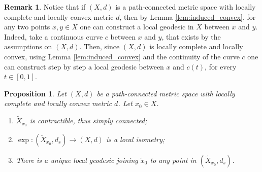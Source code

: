 \documentclass[11pt, a4paper, oneside]{memoir}
\theoremstyle{plain}\newtheorem{theorem}[subsection]{Theorem}
\newtheorem{proposition}[subsection]{Proposition}
\theoremstyle{definition}
\newtheorem{remark}[subsection]{Remark}
\newcommand{\parenum}{\setenumerate[1]{label=\textbf{(\arabic*)}}}
\newcommand{\twiddle}[1]{\widetilde{#1}}
\begin{document}
\begin{remark}
 Notice that if \((X,d)\) is a path-connected metric space with locally complete and locally convex metric \(d\), then by Lemma \ref{lem:induced_convex}, for any two points $x,y \in X$ one can construct a local geodesic in $X$ between $x$ and $y$. Indeed, take a continuous curve $c$ between $x$ and $y$, that exists by the assumptions on $(X,d)$. Then, since $(X,d)$ is locally complete and locally convex, using Lemma \ref{lem:induced_convex} and the continuity of the curve $c$ one can construct step by step a local geodesic between $x$ and $c(t)$, for every $t \in [0,1]$.
\end{remark}

\begin{proposition}\label{prop:twiddle simply connected}
Let \((X,d)\) be a path-connected metric space with locally complete and locally convex metric \(d\). Let $x_0 \in X$.
\parenum
\begin{enumerate}
    \item \(\twiddle{X}_{x_0}\) is contractible, thus simply connected;
    \item \(\exp:\left(\twiddle{X}_{x_0},d_s\right)\to (X,d)\) is a local isometry;
    \item There is a unique local geodesic joining \(\twiddle{x}_0\) to any  point in \(\left(\twiddle{X}_{x_0},d_s\right)\).
\end{enumerate}
\end{proposition}
\end{document}
